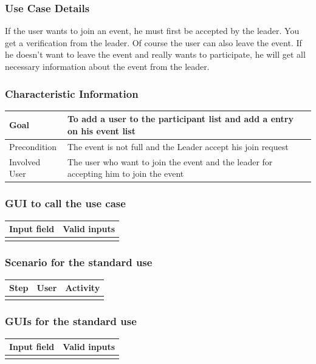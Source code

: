 \documentclass[12pt]{article}
\theoremstyle{definition}
\begin{document}
\subsubsection{Use Case Details}

If the user wants to join an event, he must first be accepted by the leader. You get a verification from the leader. Of course the user can also leave the event. If he doesn't want to leave the event and really wants to participate, he will get all necessary information about the event from the leader.

\subsubsection{Characteristic Information}

\begin{tabular}{|l|l|}
\hline
Goal & To add a user to the participant list and add a entry on his event list \\ \hline
Precondition &  The event is not full and the Leader accept his join request\\ \hline
Involved User &  The user who want to join the event and the leader for accepting him to join the event\\ \hline

\end{tabular}

\subsubsection{GUI to call the use case}

\begin{tabular}{|l|l|}
\hline
Input field & Valid inputs \\ \hline
 &  \\ \hline
\end{tabular}

\subsubsection{Scenario for the standard use}

\begin{tabular}{|l|l|l|}
\hline
Step & User & Activity \\ \hline
 & & \\ \hline
\end{tabular}

\subsubsection{GUIs for the standard use}
\begin{tabular}{|l|l|}
\hline
Input field & Valid inputs \\ \hline
 &  \\ \hline
\end{tabular}
\end{document}
